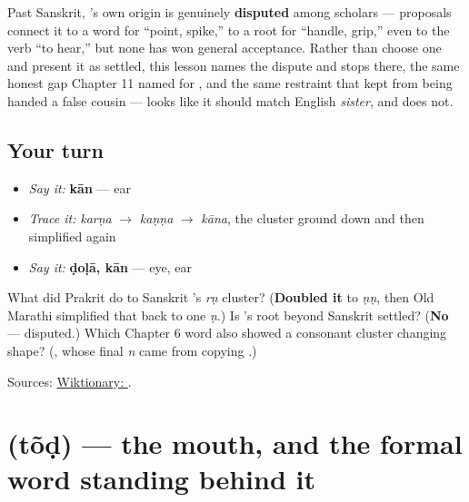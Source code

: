 \begin{cousinweb}
Past Sanskrit, \textbf{}'s own origin is genuinely \textbf{disputed} among scholars — proposals connect it to a word for \textquotedblleft{}point, spike,\textquotedblright{} to a root for \textquotedblleft{}handle, grip,\textquotedblright{} even to the verb \textquotedblleft{}to hear,\textquotedblright{} but none has won general acceptance. Rather than choose one and present it as settled, this lesson names the dispute and stops there, the same honest gap Chapter 11 named for \textbf{}, and the same restraint that kept \textbf{} from being handed a false cousin — \textbf{} looks like it should match English \emph{sister}, and does not.
\end{cousinweb}

\subsection*{Your turn}
\begin{itemize}
\raggedright
  \item \emph{Say it:} \textbf{kān} — ear
  \item \emph{Trace it:} \emph{karṇa} $\to$ \emph{kaṇṇa} $\to$ \emph{kāna}, the cluster ground down and then simplified again
  \item \emph{Say it:} \textbf{ḍoḷā, kān} — eye, ear
\end{itemize}

\begin{tcolorbox}[breakable,colback=teal!4,colframe=teal!35!black,title={Before you move on}]
What did Prakrit do to Sanskrit \textbf{}'s \emph{rṇ} cluster? (\textbf{Doubled it} to \emph{ṇṇ}, then Old Marathi simplified that back to one \emph{ṇ}.) Is \textbf{}'s root beyond Sanskrit settled? (\textbf{No} — disputed.) Which Chapter 6 word also showed a consonant cluster changing shape? (\textbf{}, whose final \emph{n} came from copying \textbf{}.)

Sources: \href{https://en.wiktionary.org/wiki/\%E0\%A4\%95\%E0\%A4\%BE\%E0\%A4\%A8}{Wiktionary: }.
\end{tcolorbox}
\section[tõḍ]{ (tõḍ) — the mouth, and the formal word standing behind it}

\label{lesson:MR-C12-tond}



